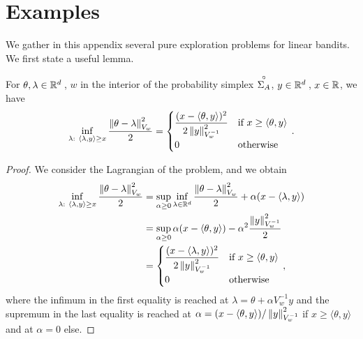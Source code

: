 \section{Examples}\label{app:lgc.examples}

We gather in this appendix several pure exploration problems for linear bandits. We first state a useful lemma.

\begin{lemma}\label{lem:lagrange_alternative}
For $\theta, \lambda \in \mathbb{R}^d\,$, $w$ in the interior of the probability simplex $\overset{\circ}{\Sigma_A}$, $y\in\mathbb{R}^d\,$, $x\in\mathbb{R}$, we have
\begin{align*}
\inf_{\lambda:\ \langle \lambda,y\rangle \geq x} \frac{\left\lVert\theta-\lambda\right\rVert^2_{V_w}}{2} = \begin{cases}
\dfrac{(x - \langle\theta,y\rangle)^2}{2 \left\lVert y\right\rVert_{V_w^{-1}}^2} &\text{if } x \geq \langle\theta,y\rangle \\
0 &\text{otherwise}
\end{cases}\,.
\end{align*}
\end{lemma}

\begin{proof}
We consider the Lagrangian of the problem, and we obtain
\begin{align*}
  \inf_{\lambda:\ \langle \lambda,y \rangle \geq x} \frac{\left\lVert\theta-\lambda\right\rVert^2_{V_w}}{2}
  &= \sup_{\alpha \geq 0}\inf_{\lambda \in \mathbb{R}^d} \frac{\left\lVert\theta-\lambda\right\rVert^2_{V_w}}{2}+ \alpha (x-\langle\lambda,y\rangle)\\
  &=  \sup_{\alpha \geq 0} \alpha (x-\langle\theta,y\rangle) - \alpha^2 \frac{\left\lVert y\right\rVert^2_{V_w^{-1}}}{2}\\
  &= \begin{cases}
  \dfrac{(x - \langle\lambda,y\rangle)^2}{2 \left\lVert y\right\rVert_{V_w^{-1}}^2} &\text{if } x \geq \langle\theta,y\rangle \\
  0 & \text{otherwise}
  \end{cases}\,,
\end{align*}
where the infimum in the first equality is reached at $\lambda = \theta + \alpha V_w^{-1} y$ and the supremum in the last equality is reached at $\alpha = (x- \langle\theta,y\rangle)/\left\lVert y\right\rVert_{V_w^{-1}}^2$ if $x \geq \langle\theta,y\rangle$ and at $\alpha = 0$ else.
\end{proof}

